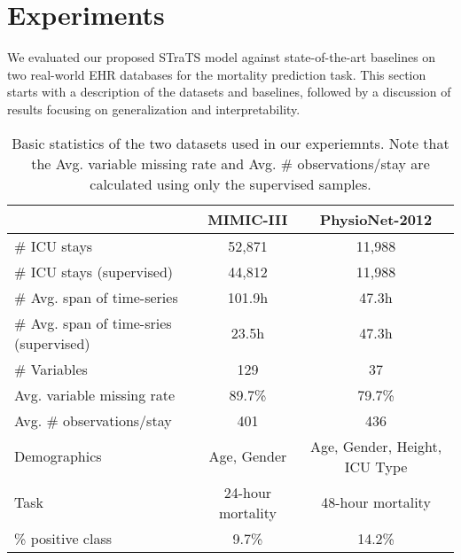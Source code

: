 \section{Experiments}
We evaluated our proposed STraTS model against state-of-the-art baselines on two real-world EHR databases for the mortality prediction task. This section starts with a description of the datasets and baselines, followed by a discussion of results focusing on generalization and interpretability.
\begin{table}
\centering
    \caption{Basic statistics of the two datasets used in our experiemnts. Note that the Avg. variable missing rate and Avg. \# observations/stay are calculated using only the supervised samples.}
    \label{tab:dataset_stats}
    \begin{tabular}{lcc}
    \toprule
    &MIMIC-III &PhysioNet-2012 \\
    \midrule
     \# ICU stays &52,871 &11,988 \\
     \# ICU stays (supervised) &44,812 &11,988 \\
     \# Avg. span of time-series &101.9h &47.3h \\
     \# Avg. span of time-sries (supervised) &23.5h &47.3h\\
      \# Variables &129 &37\\
      Avg. variable missing rate &89.7\% &79.7\%  \\
      Avg. \# observations/stay &401 &436\\
      Demographics &Age, Gender &Age, Gender, Height, ICU Type \\
      Task &24-hour mortality &48-hour mortality \\
      \% positive class &9.7\% &14.2\% \\
      \bottomrule
    \end{tabular}
\end{table}
\label{sec:exp}
